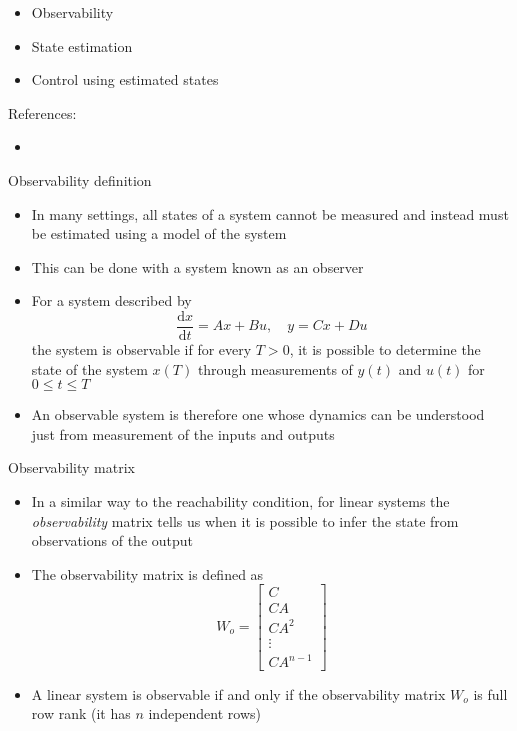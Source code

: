 \documentclass{beamer-control}
\begin{document}

\begin{SUMMARY}
\begin{itemize}
\item Observability 
\item State estimation
\item Control using estimated states
\end{itemize}
\vfill References:
\begin{itemize}
\item {}
\end{itemize}
\end{SUMMARY}



\begin{frame}{Observability definition}
\begin{itemize}
\item In many settings, all states of a system cannot be measured and instead must be estimated using a model of the system
\item This can be done with a system known as an observer
\item For a system described by 
\[\frac{\mathrm{d}x}{\mathrm{d}t} = Ax+Bu, \quad y=Cx+Du\]
the system is observable if for every $T>0$, it is possible to determine the state of the system $x(T)$ through measurements of $y(t)$ and $u(t)$ for $0\leq t \leq T$
\item An observable system is therefore one whose dynamics can be understood just from measurement of the inputs and outputs
\end{itemize}
\end{frame}

\begin{frame}{Observability matrix}
	\begin{itemize}
		\item In a similar way to the reachability condition, for linear systems the \textit{observability} matrix tells us when it is possible to infer the state from observations of the output
		\item The observability matrix is defined as 
		\[W_o = \begin{bmatrix}
			C \\ CA \\ CA^2 \\ \vdots \\ CA^{n-1}
		\end{bmatrix}\]
		\item A linear system is observable if and only if the observability matrix $W_o$ is full row rank (it has $n$ independent rows)
	\end{itemize}
\end{frame}
\end{document}
